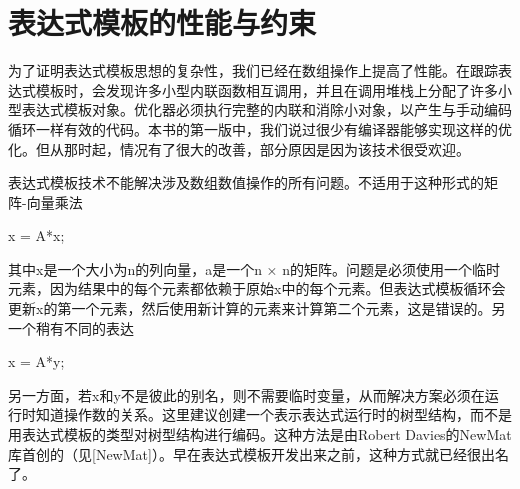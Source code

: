 \section{表达式模板的性能与约束}
为了证明表达式模板思想的复杂性，我们已经在数组操作上提高了性能。在跟踪表达式模板时，会发现许多小型内联函数相互调用，并且在调用堆栈上分配了许多小型表达式模板对象。优化器必须执行完整的内联和消除小对象，以产生与手动编码循环一样有效的代码。本书的第一版中，我们说过很少有编译器能够实现这样的优化。但从那时起，情况有了很大的改善，部分原因是因为该技术很受欢迎。

表达式模板技术不能解决涉及数组数值操作的所有问题。不适用于这种形式的矩阵-向量乘法

x = A*x;

其中x是一个大小为n的列向量，a是一个n × n的矩阵。问题是必须使用一个临时元素，因为结果中的每个元素都依赖于原始x中的每个元素。但表达式模板循环会更新x的第一个元素，然后使用新计算的元素来计算第二个元素，这是错误的。另一个稍有不同的表达

x = A*y;

另一方面，若x和y不是彼此的别名，则不需要临时变量，从而解决方案必须在运行时知道操作数的关系。这里建议创建一个表示表达式运行时的树型结构，而不是用表达式模板的类型对树型结构进行编码。这种方法是由Robert Davies的NewMat库首创的（见[NewMat]）。早在表达式模板开发出来之前，这种方式就已经很出名了。

















































